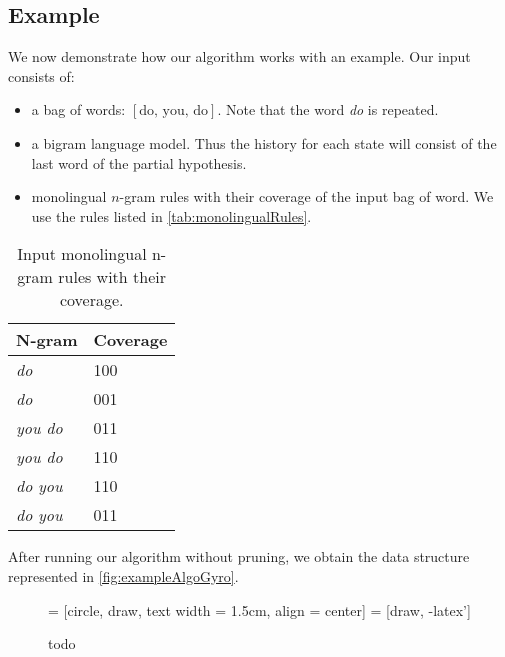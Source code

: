 \subsection{Example}

We now demonstrate how our algorithm works with an example.
Our input consists of:
%
\begin{itemize}
  \item a bag of words: $[\text{do, you, do}]$. Note that the word \emph{do} is repeated.
  \item a bigram language model. Thus the history for each state will consist of the
    last word of the partial hypothesis.
  \item monolingual $n$-gram rules with their coverage of the input bag of word. We
    use the rules listed in \autoref{tab:monolingualRules}.
\end{itemize}
%
\begin{table}
  \begin{center}
  \begin{tabular}{l|l}
    N-gram & Coverage \\
    \hline
    \emph{do} & 100 \\
    \emph{do} & 001 \\
    \emph{you do} & 011 \\
    \emph{you do} & 110 \\
    \emph{do you} & 110 \\
    \emph{do you} & 011 \\
  \end{tabular}
  \caption{Input monolingual n-gram rules with their coverage.}
  \label{tab:monolingualRules}
  \end{center}
\end{table}
%
After running our algorithm without pruning, we obtain the data structure
represented in \autoref{fig:exampleAlgoGyro}.
%
\begin{figure}
  \scriptsize
   = [circle, draw, text width = 1.5cm, align = center]
   = [draw, -latex']

  \begin{center}
  \end{center}
  \caption{todo}
  \label{fig:exampleAlgoGyro}
\end{figure}
